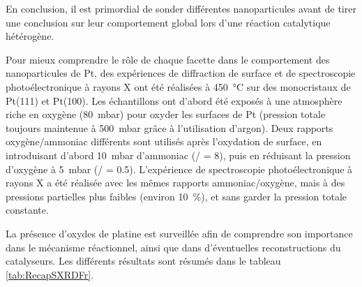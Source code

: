 {En conclusion, il est primordial de sonder différentes nanoparticules avant de tirer une conclusion sur leur comportement global lors d’une réaction catalytique hétérogène.

Pour mieux comprendre le rôle de chaque facette dans le comportement des nanoparticules de Pt, des expériences de diffraction de surface et de spectroscopie photoélectronique à rayons X ont été réalisées à \qty{450}{\degreeCelsius} sur des monocristaux de Pt(111) et Pt(100).
Les échantillons ont d'abord été exposés à une atmosphère riche en oxygène (\qty{80}{\milli\bar}) pour oxyder les surfaces de Pt (pression totale toujours maintenue à \qty{500}{\milli\bar} grâce à l'utilisation d'argon).
Deux rapports oxygène/ammoniac différents sont utilisés après l'oxydation de surface, en introduisant d'abord \qty{10}{\milli\bar} d'ammoniac (/ = \num{8}), puis en réduisant la pression d'oxygène à \qty{5}{\milli\bar} (/ = \num{0.5}).
L'expérience de spectroscopie photoélectronique à rayons X a été réalisée avec les mêmes rapports ammoniac/oxygène, mais à des pressions partielles plus faibles (environ \qty{10}{\percent}), et sans garder la pression totale constante.

La présence d'oxydes de platine est surveillée afin de comprendre son importance dans le mécanisme réactionnel, ainsi que dans d'éventuelles reconstructions du catalyseurs.
Les différents résultats sont résumés dans le tableau \ref{tab:RecapSXRDFr}.

}
